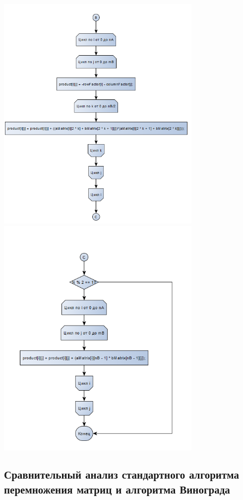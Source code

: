 \documentclass[12pt,a4paper]{scrartcl}
\begin{document}
\begin{center}
	\includegraphics[width=10cm]{multimatrixvinograd3}\\
	\includegraphics[width=10cm]{multimatrixvinograd4}\\
	\label{fig:second}
\end{center}


\newpage
\subsection{Сравнительный анализ стандартного алгоритма перемножения матриц и алгоритма Винограда}
\label{sec:construct:compare}
\end{document}

